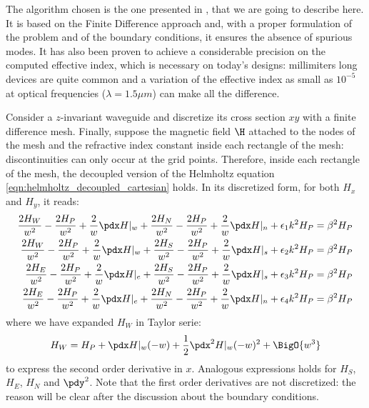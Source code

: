 The algorithm chosen is the one presented in \cite{lusse_analysis},
that we are going to describe here. It is based on the Finite
Difference approach and, with a proper formulation of the problem and
of the boundary conditions, it ensures the absence of spurious
modes. It has also been proven to achieve a considerable precision on
the computed effective index, which is necessary on today's designs:
millimiters long devices are quite common and a variation of the
effective index as small as $10^{-5}$ at optical frequencies ($\lambda
= 1.5 \mu m$) can make all the difference.

Consider a $z$-invariant waveguide and discretize its cross section
$xy$ with a finite difference mesh. Finally, suppose the magnetic
field $\H$ attached to the nodes of the mesh and the refractive index
constant inside each rectangle of the mesh: discontinuities can only
occur at the grid points. Therefore, inside each rectangle of the
mesh, the decoupled version of the Helmholtz equation
\ref{eqn:helmholtz_decoupled_cartesian} holds. In its discretized
form, for both $H_x$ and $H_y$, it reads:
\begin{eqnarray} \label{eqn:helmholtz_expansion}
  \frac{2 H_W}{w^2} - \frac{2 H_P}{w^2} + \frac{2}{w} \pdx H|_w +
  \frac{2 H_N}{w^2} - \frac{2 H_P}{w^2} + \frac{2}{w} \pdx H|_n +
  \epsilon_1 k^2 H_P = \beta^2 H_P \label{eqn:helmholtz_discretized_nw} \\
  \frac{2 H_W}{w^2} - \frac{2 H_P}{w^2} + \frac{2}{w} \pdx H|_w +
  \frac{2 H_S}{w^2} - \frac{2 H_P}{w^2} + \frac{2}{w} \pdx H|_s +
  \epsilon_2 k^2 H_P = \beta^2 H_P \label{eqn:helmholtz_discretized_sw} \\
  \frac{2 H_E}{w^2} - \frac{2 H_P}{w^2} + \frac{2}{w} \pdx H|_e +
  \frac{2 H_S}{w^2} - \frac{2 H_P}{w^2} + \frac{2}{w} \pdx H|_s +
  \epsilon_3 k^2 H_P = \beta^2 H_P \label{eqn:helmholtz_discretized_se} \\
  \frac{2 H_E}{w^2} - \frac{2 H_P}{w^2} + \frac{2}{w} \pdx H|_e +
  \frac{2 H_N}{w^2} - \frac{2 H_P}{w^2} + \frac{2}{w} \pdx H|_n +
  \epsilon_4 k^2 H_P = \beta^2 H_P \label{eqn:helmholtz_discretized_ne}
\end{eqnarray}
where we have expanded $H_W$ in Taylor serie:
$$
H_W = H_P + \pdx H|_w (-w) + \frac{1}{2} \pdx^2 H|_w (-w)^2 + \BigO{w^3}
$$
to express the second order derivative in $x$. Analogous expressions
holds for $H_S$, $H_E$, $H_N$ and $\pdy^2$. Note that the first order
derivatives are not discretized: the reason will be clear after the
discussion about the boundary conditions.

